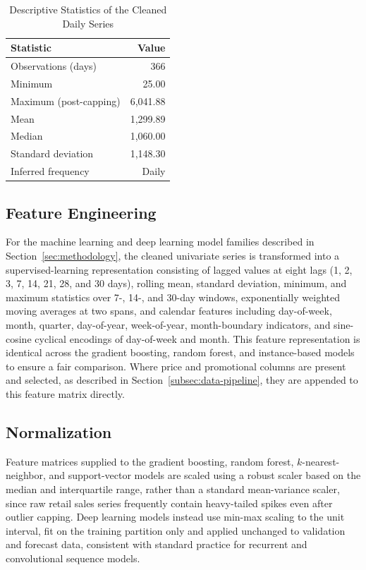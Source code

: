 \begin{table}[!t]
\caption{Descriptive Statistics of the Cleaned Daily Series}
\label{tab:dataset-stats}
\centering
\begin{tabular}{@{}lr@{}}
\toprule
\textbf{Statistic} & \textbf{Value} \\
\midrule
Observations (days) & 366 \\
Minimum & 25.00 \\
Maximum (post-capping) & 6{,}041.88 \\
Mean & 1{,}299.89 \\
Median & 1{,}060.00 \\
Standard deviation & 1{,}148.30 \\
Inferred frequency & Daily \\
\bottomrule
\end{tabular}
\end{table}

\subsection{Feature Engineering}
For the machine learning and deep learning model families described in Section~\ref{sec:methodology}, the cleaned univariate series is transformed into a supervised-learning representation consisting of lagged values at eight lags (1, 2, 3, 7, 14, 21, 28, and 30 days), rolling mean, standard deviation, minimum, and maximum statistics over 7-, 14-, and 30-day windows, exponentially weighted moving averages at two spans, and calendar features including day-of-week, month, quarter, day-of-year, week-of-year, month-boundary indicators, and sine-cosine cyclical encodings of day-of-week and month. This feature representation is identical across the gradient boosting, random forest, and instance-based models to ensure a fair comparison. Where price and promotional columns are present and selected, as described in Section~\ref{subsec:data-pipeline}, they are appended to this feature matrix directly.

\subsection{Normalization}
Feature matrices supplied to the gradient boosting, random forest, $k$-nearest-neighbor, and support-vector models are scaled using a robust scaler based on the median and interquartile range, rather than a standard mean-variance scaler, since raw retail sales series frequently contain heavy-tailed spikes even after outlier capping. Deep learning models instead use min-max scaling to the unit interval, fit on the training partition only and applied unchanged to validation and forecast data, consistent with standard practice for recurrent and convolutional sequence models.

